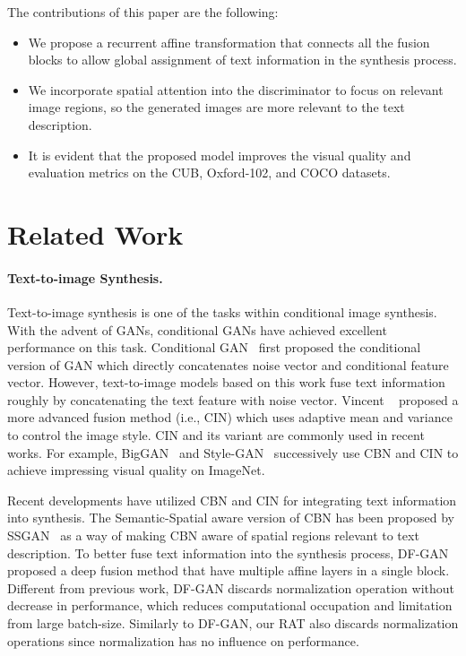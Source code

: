 \documentclass{article}
\begin{document}
	The contributions of this paper are the following:
	\begin{itemize}
		\setlength{\topsep}{0pt}
		\setlength{\itemsep}{0pt}
		\setlength{\parsep}{0pt}
		\setlength{\parskip}{0pt}
		
		\item We propose a recurrent affine transformation that connects all the fusion blocks to allow global assignment of text information in the synthesis process.
		\item We incorporate spatial attention into the discriminator to focus on relevant image regions, so the generated images are more relevant to the text description.
		\item It is evident that the proposed model improves the visual quality and evaluation metrics on the CUB, Oxford-102, and COCO datasets.
	\end{itemize}
	
	\section{Related Work}
\paragraph{Text-to-image Synthesis.}
Text-to-image synthesis is one of the tasks within conditional image synthesis. With the advent of GANs, conditional GANs have achieved excellent performance on this task. Conditional GAN~\cite{DBLP:journals/corr/MirzaO14} first proposed the conditional version of GAN which directly concatenates noise vector and conditional feature vector. However, text-to-image models based on this work fuse  text information roughly by concatenating the text feature with noise vector. Vincent ~\cite{DBLP:conf/iclr/DumoulinSK17} proposed a more advanced fusion method (i.e., CIN) which uses adaptive mean and variance to control the image style.  CIN and its variant are commonly used in recent works. For example, BigGAN~\cite{DBLP:conf/iclr/BrockDS19} and Style-GAN~\cite{DBLP:journals/pami/KarrasLA21} successively use CBN and CIN to achieve impressing visual quality on ImageNet.
    
    Recent developments have utilized CBN and CIN for integrating text information into synthesis.  The Semantic-Spatial aware version of CBN has been proposed by SSGAN~\cite{DBLP:journals/corr/abs-2104-00567} as a way of making CBN aware of spatial regions relevant to text description.  To better fuse text information into the synthesis process,
    DF-GAN~\cite{DBLP:journals/corr/abs-2008-05865} proposed a deep fusion method that have multiple affine layers in a single block. Different from previous work, DF-GAN discards normalization operation without decrease in performance, which reduces computational occupation and  limitation from large batch-size. Similarly to DF-GAN, our RAT also discards normalization operations since normalization has no influence on performance.
\end{document}
